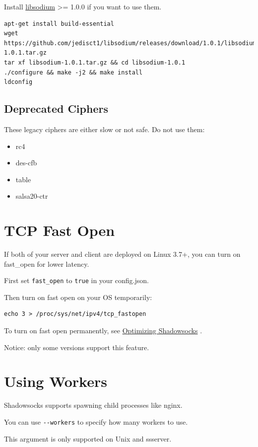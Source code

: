 \documentclass[11pt,a4paper]{sphinxmanual}
\begin{document}
Install \href{https://github.com/jedisct1/libsodium}{libsodium} >= 1.0.0 if you want to use them.

\begin{Verbatim}
apt-get install build-essential
wget https://github.com/jedisct1/libsodium/releases/download/1.0.1/libsodium-1.0.1.tar.gz
tar xf libsodium-1.0.1.tar.gz && cd libsodium-1.0.1
./configure && make -j2 && make install
ldconfig
\end{Verbatim}

\subsection{Deprecated Ciphers}
\label{sec-5-4-4}
These legacy ciphers are either slow or not safe. Do not use them:

\begin{itemize}
\item rc4
\item des-cfb
\item table
\item salsa20-ctr
\end{itemize}


\label{sec:tcp_fast_open}
\section{TCP Fast Open}
\label{sec-5-5}
If both of your server and client are deployed on Linux 3.7+, you can turn on fast\_open for lower latency.

First set \verb~fast_open~ to \verb~true~ in your config.json.

Then turn on fast open on your OS temporarily:
\begin{Verbatim}
echo 3 > /proc/sys/net/ipv4/tcp_fastopen
\end{Verbatim}

To turn on fast open permanently, see \hyperref[sec:optimizing_shadowsocks]{Optimizing Shadowsocks} .

Notice: only some versions support this feature.

\label{sec:workers}
\section{Using Workers}
\label{sec-5-6}
Shadowsocks supports spawning child processes like nginx.

You can use \verb~--workers~ to specify how many workers to use.

This argument is only supported on Unix and ssserver.
\end{document}
